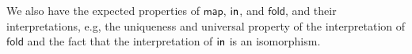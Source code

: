 \documentclass[runningheads]{llncs}
\renewcommand{\id}{\mathit{id}}
\newcommand{\map}{\mathsf{map}}
\newcommand{\fold}{\mathsf{fold}}
\renewcommand{\id}{\mathit{id}}
\begin{document}
  
\noindent
We also have the expected properties of $\map$, $\mathsf{in}$, and $\fold$,
and their interpretations, e.g, the uniqueness and universal property
of the interpretation of $\fold$ and the fact that the interpretation
of $\mathsf{in}$ is an isomorphism.

\begin{comment}
\subsection{Properties of Terms of $\Nat$-Type}\label{sec:Nat-type-terms}

Define, for $\Gamma; \ol{\alpha} \vdash F$, the term $\id_F$ to be
$\Gamma;\emptyset~|~\emptyset \vdash L_{\ol{\alpha}}x.x :
\Nat^{\ol{\alpha}} F\,F$ and, for terms $\Gamma; \emptyset \,|\,
\Delta \vdash t: \Nat^{\overline{\alpha}} F\,G$ and $\Gamma; \emptyset
\,|\, \Delta \vdash s: \Nat^{\overline{\alpha}} G\,H$, the {\em
  composition} $s \circ t$ of $t$ and $s$ to be $\Gamma;
\emptyset\,|\, \Delta \vdash L_{\overline{\alpha}}
x. s_{\overline{\alpha}}(t_{\overline{\alpha}}x):
\Nat^{\overline{\alpha}} F\,H$. Then $\setsem{\Gamma; \emptyset \,|\,
  \emptyset \vdash \id_{F} : \Nat^{\ol{\alpha}} F\,F} \rho\, \ast =
\id_{\lambda \ol{A}. \setsem{\Gamma; \ol{\alpha} \vdash F} \rho
  [\ol{\alpha := A}]}$ for any set environment $\rho$, and
$\setsem{\Gamma; \emptyset \,|\, \Delta \vdash s \circ t:
  \Nat^{\overline{\alpha}} F\,H} = \setsem{\Gamma; \emptyset \,|\,
  \Delta \vdash s: \Nat^{\overline{\alpha}} G\,H} \circ
\setsem{\Gamma; \emptyset \,|\, \Delta \vdash t:
  \Nat^{\overline{\alpha}} F\,G}$. Straightforward calculation shows
that terms of $\Nat$ type behave as natural transformations with
respect to their source and target functorial types, i.e., we have
\begin{theorem}\label{eq:ft-from-nat} 
  If\, $\Gamma; \emptyset \,|\, \Delta \vdash s : \Nat^{\overline{\alpha},
  \overline{\gamma}} F\,G$ and $\overline{\Gamma; \emptyset \,|\,
  \Delta \vdash t : \Nat^{\overline{\gamma}} K\, H}$, then
  \[\begin{array}{l}
  \hspace*{0.135in}
\setsem{\Gamma; \emptyset\,|\, \Delta
  \vdash 
  ((\map_G^{\overline{K}, \overline{H}})_\emptyset \,\overline{t}) \circ
(L_{\overline{\gamma}} z. s_{\overline{K}, \overline{\gamma}}
  z)
  : \Nat^{\overline{\gamma}} F[\overline{\alpha := K}]\,
  G[\overline{\alpha := H}]}\\

\end{comment}
\end{document}
